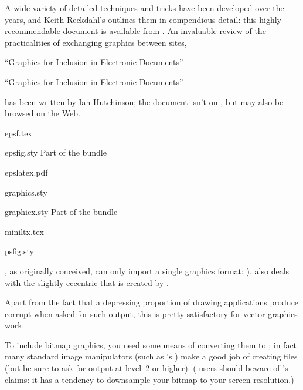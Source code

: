 A wide variety of detailed techniques and tricks have been developed
over the years, and Keith Reckdahl's  outlines them
in compendious detail: this highly recommendable document is available
from .  An invaluable review of the practicalities of
exchanging graphics between sites,
\begin{wideversion} %
``\href{http://silas.psfc.mit.edu/elec_fig/elec_figures.pdf}{Graphics for Inclusion in Electronic Documents}''
\end{wideversion}
\begin{narrowversion} %
\href{http://silas.psfc.mit.edu/elec_fig/elec_figures.pdf}%
     {``Graphics for Inclusion in Electronic Documents''}
\end{narrowversion}
has been written by Ian Hutchinson; the document isn't on ,
but may also be
\href{http://silas.psfc.mit.edu/elec_fig/}{browsed on the Web}.
\begin{ctanrefs}
\item[epsf.tex]
\item[epsfig.sty]Part of the  bundle
\item[epslatex.pdf]
\item[graphics.sty]
\item[graphicx.sty]Part of the  bundle
\item[miniltx.tex]
\item[psfig.sty]
\end{ctanrefs}


, as originally conceived, can only import a single
graphics format: %
).
 also deals with the slightly eccentric  that is
created by .

Apart from the fact that a depressing proportion of drawing
applications produce corrupt  when asked for such output,
this is pretty satisfactory for vector graphics work.

To include bitmap graphics, you need some means of converting them to
\PS{}; in fact many standard image manipulators (such as
's ) make a good job of
creating  files (but be sure to ask for output at \PS{}
level~2 or higher).  ( users should beware of
's claims: it has a tendency to downsample your bitmap to
your screen resolution.)

